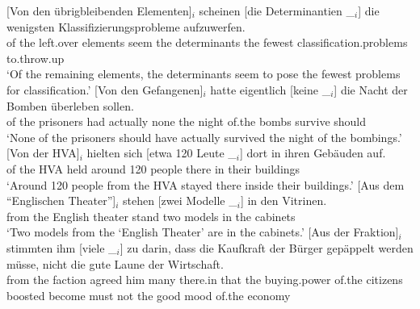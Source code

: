 \begin{sloppypar}
\eal
\ex 
\gll {}[Von den übrigbleibenden Elementen]$_i$ scheinen [die Determinantien \_$_i$] die wenigsten Klassifizierungsprobleme aufzuwerfen.\footnotemark\\
     \spacebr{}of the left.over elements seem \spacebr{}the determinants {} the fewest classification.problems to.throw.up\\
\glt `Of the remaining elements, the determinants seem to pose the fewest problems for classification.'
\ex\label{bsp-von-den-gefangenen} 
\gll {}[Von den Gefangenen]$_i$ hatte eigentlich [keine \_$_i$] die Nacht der Bomben überleben sollen.\footnotemark\\
	 {}\spacebr{}of the prisoners had actually \spacebr{}none {} the night of.the bombs survive should\\
\glt `None of the prisoners should have actually survived the night of the bombings.'
\ex 
\gll {}[Von der HVA]$_i$ hielten sich [etwa 120 Leute \_$_i$] dort in ihren Gebäuden auf.\footnotemark\\
	 {}\spacebr{}of the HVA held  \spacebr{}around 120 people {} there in their buildings \prt{}\\
\glt `Around 120 people from the HVA stayed there inside their buildings.'
\ex 
\gll {}[Aus dem "`Englischen Theater"']$_i$ stehen [zwei Modelle \_$_i$] in den Vitrinen.\footnotemark\hspace{-3pt}\\
	 {}\spacebr{}from the English theater stand \spacebr{}two models {} in the cabinets\\
\glt `Two models from the `English Theater' are in the cabinets.'
\ex 
\gll {}[Aus der Fraktion]$_i$ stimmten ihm [viele \_$_i$] zu darin, dass die Kaufkraft der Bürger gepäppelt werden müsse, nicht die gute Laune der Wirtschaft.\footnotemark\\
	 {}\spacebr{}from the faction agreed him \spacebr{}many {} \prt{} there.in that the buying.power of.the citizens boosted become must not the good mood of.the economy\\

\end{sloppypar}
